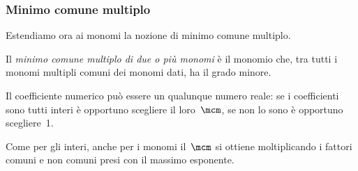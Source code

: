 \subsubsection{Minimo comune multiplo}

Estendiamo ora ai monomi la nozione di minimo comune multiplo.

\begin{definizione}
 Il \emph{minimo comune multiplo di due o più monomi}
è il monomio che, tra tutti i monomi multipli comuni dei monomi dati,
ha il grado minore.
\end{definizione}

Il coefficiente numerico può essere un qualunque numero reale: se i
coefficienti sono tutti interi è opportuno scegliere il loro~$\mcm$,
se non lo sono è opportuno scegliere~1.

Come per gli interi, anche per i monomi il~$\mcm$ si ottiene moltiplicando 
i fattori comuni e non comuni presi con il massimo esponente.

